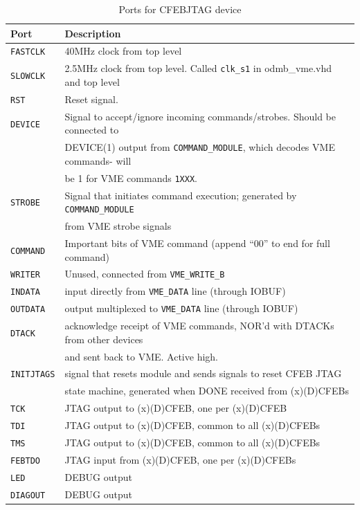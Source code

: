 \documentclass[10pt,a4paper]{article}
\begin{document}
\begin{table}[H]
\centering
\begin{tabular}{|l|l|} \hline
Port& Description\\ \hline
\texttt{FASTCLK}& 40MHz clock from top level\\ \hline
\texttt{SLOWCLK}& 2.5MHz clock from top level. Called \texttt{clk\_s1} in odmb\_vme.vhd and top level \\ \hline
\texttt{RST}& Reset signal.\\ \hline
\texttt{DEVICE}& Signal to accept/ignore incoming commands/strobes. Should be connected to  \\
      & DEVICE(1) output from \texttt{COMMAND\_MODULE}, which decodes VME commands- will  \\
			& be 1 for VME commands \texttt{1XXX}.\\ \hline 
\texttt{STROBE}& Signal that initiates command execution; generated by \texttt{COMMAND\_MODULE} \\
      & from VME strobe signals\\ \hline
\texttt{COMMAND}& Important bits of VME command (append ``00'' to end for full command)\\ \hline
\texttt{WRITER}& Unused, connected from \texttt{VME\_WRITE\_B}\\ \hline
\texttt{INDATA}& input directly from \texttt{VME\_DATA} line (through IOBUF)\\ \hline
\texttt{OUTDATA}& output multiplexed to \texttt{VME\_DATA} line (through IOBUF)\\ \hline
\texttt{DTACK}& acknowledge receipt of VME commands, NOR'd with DTACKs from other devices \\
     & and sent back to VME. Active high.\\ \hline
\texttt{INITJTAGS}& signal that resets module and sends signals to reset CFEB JTAG \\
         & state machine, generated when DONE received from (x)(D)CFEBs\\ \hline
\texttt{TCK}& JTAG output to (x)(D)CFEB, one per (x)(D)CFEB\\ \hline
\texttt{TDI}& JTAG output to (x)(D)CFEB, common to all (x)(D)CFEBs\\ \hline
\texttt{TMS}& JTAG output to (x)(D)CFEB, common to all (x)(D)CFEBs\\ \hline
\texttt{FEBTDO}& JTAG input from (x)(D)CFEB, one per (x)(D)CFEBs\\ \hline
\texttt{LED}& DEBUG output\\ \hline
\texttt{DIAGOUT}& DEBUG output\\ \hline
\end{tabular}
\caption{Ports for CFEBJTAG device}
\label{tab:cfebjtaginterface}
\end{table}
\end{document}
